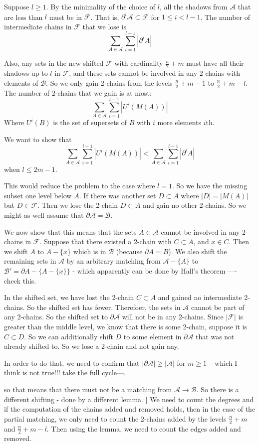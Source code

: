 \documentclass[11pt]{article}
\newcommand{\F}{\mathcal{F}}
\newcommand{\A}{\mathcal{A}}
\newcommand{\B}{\mathcal{B}}
\begin{document}
Suppose $l \geq 1$. By the minimality of the choice of $l$, all the shadows from $\A$ that are less than $l$ must be in $\F$. That is, $\partial^i\A \subset \F$ for $1 \leq i < l-1$. The number of intermediate chains in $\F$ that we lose is
\[ \sum_{A \in \A} \sum_{i=1}^{l-1} |\partial^i A| \]

Also, any sets in the new shifted $\F$ with cardinality $\frac{n}{2} + m$ must have all their shadows up to $l$ in $\F$, and these sets cannot be involved in any 2-chains with elements of $\B$. So we only gain 2-chains from the levels $\frac{n}{2}+m-1$ to $\frac{n}{2}+m-l$. The number of 2-chains that we gain is at most:
\[ \sum_{A \in \A} \sum_{i=1}^{l-1} |U^i(M(A))| \]
Where $U^i(B)$ is the set of supersets of $B$ with $i$ more elements $i$th.

We want to show that \[ \sum_{A \in \A} \sum_{i=1}^{l-1} |U^i(M(A))| <  \sum_{A \in \A} \sum_{i=1}^{l-1} |\partial^i A| \] when $l \leq 2m-1$.

This would reduce the problem to the case where $l=1$. So we have the missing subset one level below $A$. If there was another set $D \subset A$ where $|D| = |M(A)|$ but $D \in \F$. Then we lose the 2-chain $D \subset A$ and gain no other 2-chains. So we might as well assume that $\partial \A = \B$. 

We now show that this means that the sets $A \in \A$ cannot be involved in any 2-chains in $\F$. Suppose that there existed a 2-chain with $C \subset A$, and $x \in C$. Then we shift $A$ to $A - \{ x \}$ which is in $\B$ (because $\partial A = B$). We also shift the remaining sets in $\A$ by an arbitrary matching from $\A - \{ A \}$ to $\B' = \partial A - \{ A - \{x\} \}$ - which apparently can be done by Hall's theorem ---- check this. 

In the shifted set, we have lost the 2-chain $C \subset A$ and gained no intermediate 2-chains. So the shifted set has fewer. Therefoer, the sets in $\A$ cannot be part of any 2-chains. So the shifted set to $\partial \A$ will not be in any 2-chains. Since $|\F|$ is greater than the middle level, we know that there is some 2-chain, suppose it is $C \subset D$. So we can additionally shift $D$ to some element in $\partial \A$ that was not already shifted to. So we lose a 2-chain and not gain any. 

In order to do that, we need to confirm that $|\partial \A| \geq |\A|$ for $m\geq 1$ -- which I think is not true!!! take the full cycle---. 

so that means that there must not be a matching from $\A \rightarrow \B$. So there is a different shifting - done by a different lemma. ]
We need to count the degrees and if the computation of the chains added and removed holds, then in the case of the partial matching, we only need to count the 2-chains added by the levels $\frac{n}{2}+m$ and $\frac{n}{2} + m - l$. Then using the lemma, we need to count the edges added and removed. 
\end{document}
